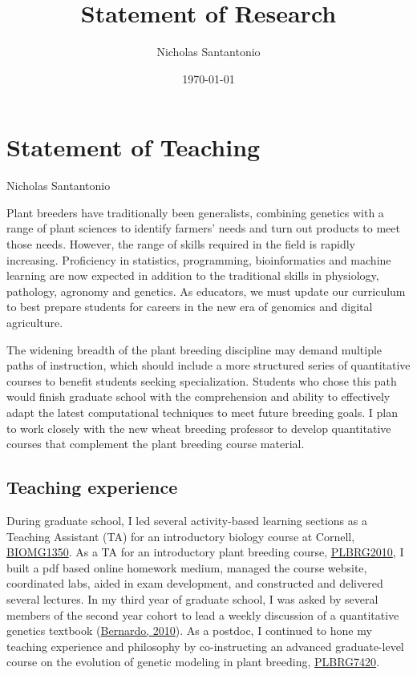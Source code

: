 \documentclass[11pt]{article}
\title{Statement of Research}
\author{Nicholas Santantonio}
\date{\today}
\begin{document}
\section*{\centering Statement of Teaching}
\begin{center} Nicholas Santantonio \end{center}

\noindent Plant breeders have traditionally been generalists, combining genetics with a range of plant sciences to identify farmers' needs and turn out products to meet those needs. However, the range of skills required in the field is rapidly increasing. Proficiency in statistics, programming, bioinformatics and machine learning are now expected in addition to the traditional skills in physiology, pathology, agronomy and genetics. As educators, we must update our curriculum to best prepare students for careers in the new era of genomics and digital agriculture. 

The widening breadth of the plant breeding discipline may demand multiple paths of instruction, which should include a more structured series of quantitative courses to benefit students seeking specialization. Students who chose this path would finish graduate school with the comprehension and ability to effectively adapt the latest computational techniques to meet future breeding goals. I plan to work closely with the new wheat breeding professor to develop quantitative courses that complement the plant breeding course material.

\subsection*{Teaching experience}

During graduate school, I led several activity-based learning sections as a Teaching Assistant (TA) for an introductory biology course at Cornell, \href{https://classes.cornell.edu/browse/roster/SP19/class/BIOMG/1350}{BIOMG1350}. As a TA for an introductory plant breeding course, \href{https://classes.cornell.edu/browse/roster/FA17/class/PLBRG/2010}{PLBRG2010}, I built a pdf based online homework medium, managed the course website, coordinated labs, aided in exam development, and constructed and delivered several lectures. In my third year of graduate school, I was asked by several members of the second year cohort to lead a weekly discussion of a quantitative genetics textbook (\href{http://stemmapress.com/}{Bernardo, 2010}). As a postdoc, I continued to hone my teaching experience and philosophy by co-instructing an advanced graduate-level course on the evolution of genetic modeling in plant breeding, \href{https://classes.cornell.edu/browse/roster/FA19/class/PLBRG/7420}{PLBRG7420}.
\end{document}

